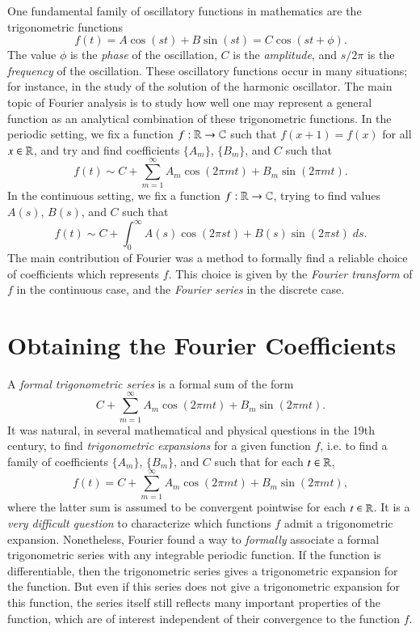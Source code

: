 One fundamental family of oscillatory functions in mathematics are the trigonometric functions
%
\[ f(t) = A \cos(st) + B \sin(st) = C \cos(st + \phi). \]
%
The value $\phi$ is the \emph{phase} of the oscillation, $C$ is the \emph{amplitude}, and $s/2\pi$ is the \emph{frequency} of the oscillation. These oscillatory functions occur in many situations; for instance, in the study of the solution of the harmonic oscillator. The main topic of Fourier analysis is to study how well one may represent a general function as an analytical combination of these trigonometric functions. In the periodic setting, we fix a function $f: \operatorname{\mathbb{R}} \to \operatorname{\mathbb{C}}$ such that $f(x + 1) = f(x)$ for all $x \in \operatorname{\mathbb{R}}$, and try and find coefficients $\{ A_m \}$, $\{ B_m \}$, and $C$ such that
%
\[ f(t) \sim C + \sum_{m = 1}^\infty A_m \cos(2 \pi mt) + B_m \sin(2 \pi mt). \]
%
In the continuous setting, we fix a function $f: \operatorname{\mathbb{R}} \to \operatorname{\mathbb{C}}$, trying to find values $A(s)$, $B(s)$, and $C$ such that
%
\[ f(t) \sim C + \int_0^\infty A(s) \cos(2 \pi st) + B(s) \sin(2 \pi st)\; ds. \]
%
The main contribution of Fourier was a method to formally find a reliable choice of coefficients which represents $f$. This choice is given by the \emph{Fourier transform} of $f$ in the continuous case, and the \emph{Fourier series} in the discrete case.

\section{Obtaining the Fourier Coefficients}

A \emph{formal trigonometric series} is a formal sum of the form
%
\[ C + \sum_{m = 1}^\infty A_m \cos(2\pi mt) + B_m \sin(2\pi mt). \]
%
It was natural, in several mathematical and physical questions in the 19th century, to find \emph{trigonometric expansions} for a given function $f$, i.e. to find a family of coefficients $\{ A_m \}$, $\{ B_m \}$, and $C$ such that for each $t \in \operatorname{\mathbb{R}}$,
%
\[ f(t) = C + \sum_{m = 1}^\infty A_m \cos(2 \pi m t) + B_m \sin(2 \pi m t), \]
%
where the latter sum is assumed to be convergent pointwise for each $t \in \operatorname{\mathbb{R}}$. It is a \emph{very difficult question} to characterize which functions $f$ admit a trigonometric expansion. Nonetheless, Fourier found a way to \emph{formally} associate a formal trigonometric series with any integrable periodic function. If the function is differentiable, then the trigonometric series gives a trigonometric expansion for the function. But even if this series does not give a trigonometric expansion for this function, the series itself still reflects many important properties of the function, which are of interest independent of their convergence to the function $f$.

